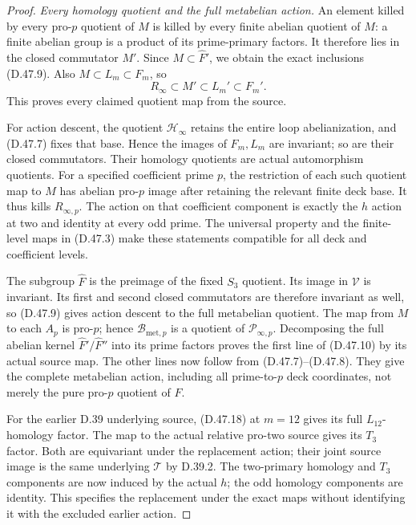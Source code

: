 \begin{proof}
\emph{Every homology quotient and the full metabelian action.}
An element killed by
every pro-\(p\)
quotient of \(M\)
is killed by every
finite abelian quotient
of \(M\): a finite
abelian group is a
product of its
prime-primary factors.
It therefore lies
in the closed
commutator \(M'\).
Since \(M\subset
\widehat F'\),
we obtain the
exact inclusions
(D.47.9).
Also \(M\subset L_m
\subset F_m\), so
\[
                R_\infty\subset M'\subset L_m'
                                               \subset F_m'. \tag{D.47.18}
\]
This proves every
claimed quotient
map from the source.

For action descent,
the quotient
\(\mathcal H_\infty\)
retains the entire
loop abelianization,
and (D.47.7) fixes
that base. Hence
the images of
\(F_m,L_m\) are
invariant; so are
their closed
commutators.
Their homology
quotients are actual
automorphism quotients.
For a specified
coefficient prime
\(p\), the restriction
of each such quotient
map to \(M\) has
abelian pro-\(p\)
image after retaining
the relevant finite
deck base. It thus
kills
\(R_{\infty,p}\).
The action on
that coefficient
component is exactly
the \(h\) action
at two and identity
at every odd prime.
The universal
property and the
finite-level maps
in (D.47.3) make
these statements
compatible for all
deck and coefficient
levels.

The subgroup
\(\widehat F\)
is the preimage
of the fixed
\(S_3\) quotient.
Its image in
\(\mathcal V\)
is invariant.
Its first and
second closed
commutators are
therefore invariant
as well, so
(D.47.9) gives
action descent to
the full metabelian
quotient.
The map from \(M\)
to each \(A_p\)
is pro-\(p\);
hence
\(\mathcal B_{\mathrm{met},p}\)
is a quotient of
\(\mathcal P_{\infty,p}\).
Decomposing the
full abelian
kernel
\(\widehat F'/\widehat F''\)
into its prime
factors proves
the first line of
(D.47.10) by its
actual source map.
The other lines
now follow from
(D.47.7)--(D.47.8).
They give the
complete metabelian
action, including
all prime-to-\(p\)
deck coordinates,
not merely the
pure pro-\(p\)
quotient of \(F\).

For the earlier
D.39 underlying
source, (D.47.18)
at \(m=12\)
gives its full
\(L_{12}\)-homology
factor. The map
to the actual
relative pro-two
source gives
its \(T_3\) factor.
Both are equivariant
under the replacement
action; their joint
source image is
the same underlying
\(\mathcal T\) by
D.39.2. The
two-primary homology
and \(T_3\) components
are now induced by
the actual \(h\);
the odd homology
components are
identity. This
specifies the
replacement under
the exact maps
without identifying
it with the
excluded earlier
action.


\end{proof}
